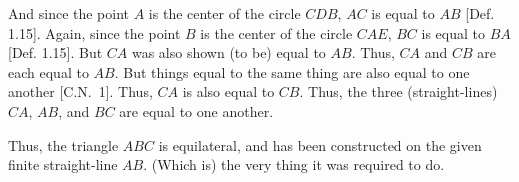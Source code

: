 \begin{Parallel}{}{}
{And since the point $A$ is the center of the circle $CDB$, $AC$ is equal to $AB$ [Def. 1.15]. Again,
since the point $B$ is the center of the circle $CAE$, $BC$ is equal to $BA$ [Def. 1.15]. But $CA$ 
was also shown (to be) equal to $AB$. Thus, $CA$ and $CB$ are each equal to $AB$. But things equal to the same thing are also equal to one another [C.N.~1]. Thus, $CA$ is also equal to $CB$. Thus, the three (straight-lines) $CA$, $AB$, and $BC$ are equal to one another.

Thus, the triangle $ABC$ is equilateral, and has been constructed on the
given finite straight-line $AB$. (Which is) the very thing it was required to do.}
\end{Parallel}


\vspace{7pt}{\footnotesize
\noindent $^\dag$ The assumption that the circles do indeed cut one another should be counted as an additional 
postulate. There is also an implicit assumption that two straight-lines cannot share a common segment.}

